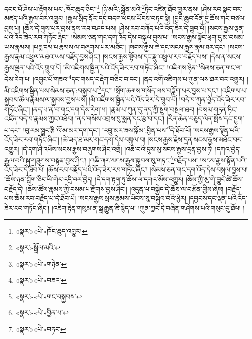 དབང་པོ་ཤེས་པ་རྟོགས་པར་:ཁོང་ཆུད་ཅིང་།\footnote{«སྣར་»«པེ་»ཁོང་ཆུད་འགྱུར།} །ཉི་མའི་:སྒྲོན་མའི་\footnote{«སྣར་»སྒྲོལ་མའི་}ཏིང་འཛིན་ཐོབ་གྱུར་ནས། །ཤེས་རབ་སྣང་བར་མཛད་པའི་རྒྱལ་བར་འགྱུར། །རྒྱལ་སྲིད་ནོར་དང་བདག་ཕངས་ཡོངས་བཏང་སྟེ། །བྱང་ཆུབ་དོན་དུ་ཆོས་གང་བཙལ་བྱས་པ། །ཆོས་དེ་གུས་པར་བྱས་ནས་རབ་བཤད་པས། །ཤེས་རབ་བཀོད་པའི་འོད་ཟེར་དེ་གྲུབ་པོ། །སངས་རྒྱས་ལྡན་པའི་འོད་ཟེར་རབ་གཏོང་ཞིང་། །སེམས་ཅན་གང་དག་འོད་དེས་བསྐུལ་བྱས་པ། །སངས་རྒྱས་སྟོང་ཕྲག་དུ་མ་བསམ་ཡས་རྣམས། །པདྨ་དམ་པ་རྣམས་ལ་བཞུགས་པར་མཐོང་། །སངས་རྒྱས་ཆེ་དང་སངས་རྒྱས་རྣམ་ཐར་དང་། །སངས་རྒྱས་རྣམ་འཕྲུལ་མཐའ་ཡས་བརྗོད་བྱས་ཤིང་། །སངས་རྒྱས་སྟོབས་དང་རྫུ་འཕྲུལ་རབ་བརྗོད་པས། །དེས་ན་སངས་རྒྱས་ལྡན་པའི་འོད་གྲུབ་པོ། །མི་འཇིགས་སྦྱིན་པའི་འོད་ཟེར་རབ་གཏོང་ཞིང་། །འཇིགས་ཉེན་\footnote{«སྣར་»«པེ་»གཉེན་}སེམས་ཅན་གང་ལ་དེས་རེག་པ། །འབྱུང་པོ་གཟའ་\footnote{«སྣར་»«པེ་»བཟའ་}དང་གསད་བརྡེག་བཅིང་བ་དང་། །ནད་འགོ་འཇིགས་པ་ཀུན་ལས་ཐར་བར་འགྱུར། །མི་འཇིགས་སྦྱིན་པས་སེམས་ཅན་:བསྐྱབ་པ་\footnote{«སྣར་»«པེ་»གང་བསྐྱབས་}དང་། །སྲོག་ཆགས་གསོད་ལས་བཟློག་པར་བྱས་པ་དང་། །འཇིགས་པ་སྐྱབས་ཚོལ་རྣམས་ལ་སྐྱབས་བྱས་པས། །མི་འཇིགས་སྦྱིན་པའི་འོད་ཟེར་དེ་གྲུབ་པོ། །བདེ་བ་ཀུན་བྱེད་འོད་ཟེར་རབ་གཏོང་ཞིང་། །ནད་པ་ན་བ་གང་དག་དེས་རེག་པ། །རྣམ་པ་ཀུན་དུ་ནད་ཀྱི་སྡུག་བསྔལ་ཐར། །བསམ་གཏན་ཏིང་འཛིན་བདེ་བ་རྣམས་ཀྱང་འཐོབ། །ནད་གསོས་འབྲས་བུ་སྨན་དང་རྩ་བ་དང་། །རིན་ཆེན་བཅུད་ལེན་སྤོས་དང་བྱུག་པ་དང་། །བུ་རམ་སྦྲང་རྩི་འོ་མ་མར་དག་དང་། །འབྲུ་མར་ཟས་སྐོམ་:བྱིན་པས་\footnote{«སྣར་»«པེ་»བྱིན་པ་}དེ་ཐོབ་པོ། །སངས་རྒྱས་སྟོན་པའི་འོད་ཟེར་རབ་གཏོང་ཞིང་། །ཚེ་ཟད་ཐ་མར་གང་དག་དེས་བསྐུལ་བ། །སངས་རྒྱས་རྗེས་དྲན་སངས་རྒྱས་མཐོང་བར་འགྱུར། །དེ་དག་ཤི་འཕོས་སངས་རྒྱས་བཞུགས་ཤིང་འགྲོ། །འཆི་བའི་དུས་སུ་སངས་རྒྱས་དྲན་བྱས་ཏེ། །དགའ་བྱེད་རྒྱལ་བའི་སྐུ་གཟུགས་བསྟན་བྱས་ཤིང་། །འཆི་ཀར་སངས་རྒྱས་སྐྱབས་སུ་གཏང་\footnote{«སྣར་»«པེ་»བཏང་}བརྗོད་པས། །སངས་རྒྱས་སྟོན་པའི་འོད་ཟེར་དེ་ཐོབ་པོ། །ཆོས་རབ་བརྗོད་པའི་འོད་ཟེར་རབ་གཏོང་ཞིང་། །སེམས་ཅན་གང་དག་འོད་དེས་བསྐུལ་བྱས་པ། །ཆོས་ཉན་ཀློག་ཅིང་ཡི་གེར་འདྲི་བར་བྱེད། །དེ་དག་རྟག་ཏུ་ཆོས་ལ་དགའ་མོས་འགྱུར། །ཆོས་ཀྱི་མུ་གེ་བྱུང་ཚེ་ཆོས་བརྗོད་དེ། །ཆོས་ཚོལ་རྣམས་ཀྱི་བསམ་པ་རྫོགས་བྱས་ཤིང་། །འདུན་པ་བསྐྱེད་དེ་ཆོས་ལ་བརྩོན་གྱིས་ཞེས། །བརྗོད་པས་ཆོས་རབ་བརྗོད་པ་དེ་ཐོབ་པོ། །སངས་རྒྱས་སྲས་རྣམས་ཡོངས་སུ་བསྐུལ་བའི་ཕྱིར། །དབྱངས་དང་ལྡན་པའི་འོད་ཟེར་རབ་གཏོང་ཞིང་། །འཇིག་རྟེན་གསུམ་ན་སྒྲ་རྒྱུན་ཇི་སྙེད་པ། །ཀུན་ཀྱང་དེ་བཞིན་གཤེགས་པའི་གསུང་དུ་ཐོས། །
